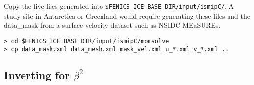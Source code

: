 \documentclass[11pt, reqno, nocenter]{article}
\begin{document}
Copy the five files generated into {\tt \$FENICS\_ICE\_BASE\_DIR/input/ismipC/}. A study site in Antarctica or Greenland would require generating these files and the data\_mask from a surface velocity dataset such as NSIDC MEaSUREs.

\begin{verbatim}
> cd $FENICS_ICE_BASE_DIR/input/ismipC/momsolve
> cp data_mask.xml data_mesh.xml mask_vel.xml u_*.xml v_*.xml ..
\end{verbatim}

\subsection{Inverting for $\beta^2$}
\end{document}
